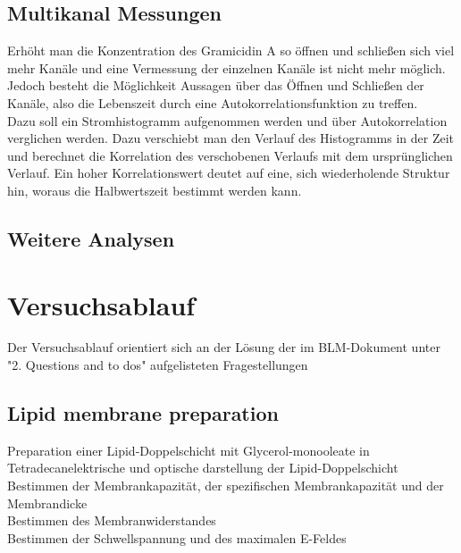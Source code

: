 \documentclass{include/thesisclass3}
\begin{document}

\section{Multikanal Messungen}
Erhöht man die Konzentration des Gramicidin A so öffnen und schließen sich viel mehr Kanäle und eine Vermessung der einzelnen Kanäle ist nicht mehr möglich. Jedoch besteht die Möglichkeit Aussagen über das Öffnen und Schließen der Kanäle, also die Lebenszeit durch eine Autokorrelationsfunktion zu treffen.\\
Dazu soll ein Stromhistogramm aufgenommen werden und über Autokorrelation verglichen werden. Dazu verschiebt man den Verlauf des Histogramms in der Zeit und berechnet die Korrelation des verschobenen Verlaufs mit dem ursprünglichen Verlauf. Ein hoher Korrelationswert deutet auf eine, sich wiederholende Struktur hin, woraus die Halbwertszeit bestimmt werden kann.

\section{Weitere Analysen}







\chapter{Versuchsablauf}
Der Versuchsablauf orientiert sich an der Lösung der im BLM-Dokument unter "2. Questions and to dos" aufgelisteten Fragestellungen
\section{Lipid membrane preparation}

Preparation einer Lipid-Doppelschicht mit Glycerol-monooleate in Tetradecanelektrische und optische darstellung der Lipid-Doppelschicht\\

Bestimmen der Membrankapazität, der spezifischen Membrankapazität und der Membrandicke\\ 

Bestimmen des Membranwiderstandes\\ 

Bestimmen der Schwellspannung und des maximalen E-Feldes
\end{document}
